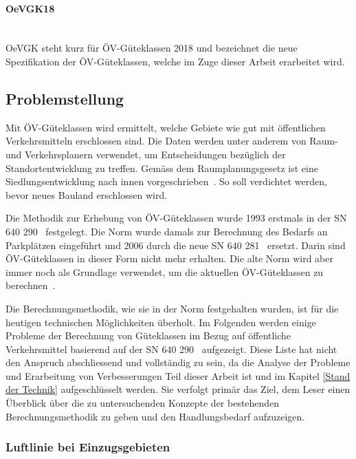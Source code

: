 \paragraph{OeVGK18}~\\
OeVGK steht kurz für \acs{ÖV}-Güteklassen 2018 und bezeichnet die neue Spezifikation der \acs{ÖV}-Güteklassen, welche im Zuge dieser Arbeit erarbeitet wird.

\subsection{Problemstellung}
\label{Einführung:Problemstellung}

Mit \acs{ÖV}-Güteklassen wird ermittelt, welche Gebiete wie gut mit öffentlichen Verkehrsmitteln erschlossen sind.
Die Daten werden unter anderem von Raum- und Verkehrsplanern verwendet, um Entscheidungen bezüglich der Standortentwicklung zu treffen.
Gemäss dem Raumplanungsgesetz ist eine Siedlungsentwicklung nach innen vorgeschrieben~\cite{raumplanungsgesetz}.
So soll verdichtet werden, bevor neues Bauland erschlossen wird.

Die Methodik zur Erhebung von \acs{ÖV}-Güteklassen wurde 1993 erstmals in der \ac{SN} 640 290~\cite{sn640290} festgelegt.
Die Norm wurde damals zur Berechnung des Bedarfs an Parkplätzen eingeführt und 2006 durch die neue \acs{SN} 640 281~\cite{sn640281} ersetzt.
Darin sind \acs{ÖV}-Güteklassen in dieser Form nicht mehr erhalten. Die alte Norm wird aber immer noch als Grundlage verwendet, um die aktuellen \acs{ÖV}-Güteklassen zu berechnen~\cite{berechnung_are}.

Die Berechnungsmethodik, wie sie in der Norm festgehalten wurden, ist für die heutigen technischen Möglichkeiten überholt.
Im Folgenden werden einige Probleme der Berechnung von Güteklassen im Bezug auf öffentliche Verkehrsmittel basierend auf der \ac{SN} 640 290~\cite{sn640290} aufgezeigt.
Diese Liste hat nicht den Anspruch abschliessend und vollständig zu sein, da die Analyse der Probleme und Erarbeitung von Verbesserungen Teil dieser Arbeit ist und im Kapitel \ref{Stand der Technik} aufgeschlüsselt werden.
Sie verfolgt primär das Ziel, dem Leser einen Überblick über die zu untersuchenden Konzepte der bestehenden Berechnungsmethodik zu geben und den Handlungsbedarf aufzuzeigen.

\subsubsection{Luftlinie bei Einzugsgebieten}
\label{Problemstellung:Luftlinie bei Einzugsgebieten}

